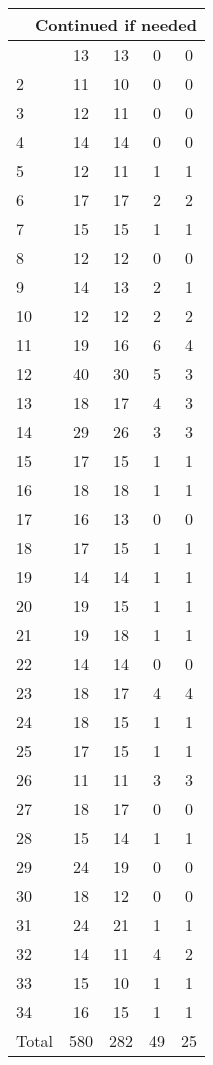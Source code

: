 \begin{center}
\begin{longtable}{l|c|c|c|c}
\hline \multicolumn{5}{|r|}{{Continued if needed}} \\ \hline
\endfoot 
1 & 13 & 13 & 0 & 0\\ \hline
2 & 11 & 10 & 0 & 0\\ \hline
3 & 12 & 11 & 0 & 0\\ \hline
4 & 14 & 14 & 0 & 0\\ \hline
5 & 12 & 11 & 1 & 1\\ \hline
6 & 17 & 17 & 2 & 2\\ \hline
7 & 15 & 15 & 1 & 1\\ \hline
8 & 12 & 12 & 0 & 0\\ \hline
9 & 14 & 13 & 2 & 1\\ \hline
10 & 12 & 12 & 2 & 2\\ \hline
11 & 19 & 16 & 6 & 4\\ \hline
12 & 40 & 30 & 5 & 3\\ \hline
13 & 18 & 17 & 4 & 3\\ \hline
14 & 29 & 26 & 3 & 3\\ \hline
15 & 17 & 15 & 1 & 1\\ \hline
16 & 18 & 18 & 1 & 1\\ \hline
17 & 16 & 13 & 0 & 0\\ \hline
18 & 17 & 15 & 1 & 1\\ \hline
19 & 14 & 14 & 1 & 1\\ \hline
20 & 19 & 15 & 1 & 1\\ \hline
21 & 19 & 18 & 1 & 1\\ \hline
22 & 14 & 14 & 0 & 0\\ \hline
23 & 18 & 17 & 4 & 4\\ \hline
24 & 18 & 15 & 1 & 1\\ \hline
25 & 17 & 15 & 1 & 1\\ \hline
26 & 11 & 11 & 3 & 3\\ \hline
27 & 18 & 17 & 0 & 0\\ \hline
28 & 15 & 14 & 1 & 1\\ \hline
29 & 24 & 19 & 0 & 0\\ \hline
30 & 18 & 12 & 0 & 0\\ \hline
31 & 24 & 21 & 1 & 1\\ \hline
32 & 14 & 11 & 4 & 2\\ \hline
33 & 15 & 10 & 1 & 1\\ \hline
34 & 16 & 15 & 1 & 1\\ \hline
\hline \hline
Total & 580 & 282 & 49 & 25




\end{longtable}
\end{center}

